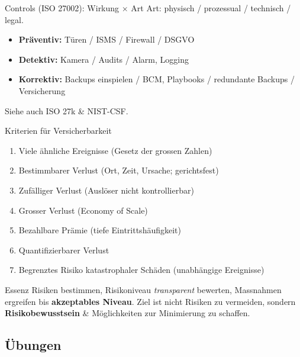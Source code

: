 \documentclass[a4paper, fontsize=7pt]{scrartcl}
\begin{document}
\begin{mainbox}{Controls (ISO 27002): Wirkung $\times$ Art}
Art: physisch / prozessual / technisch / legal.
\begin{itemize}
    \item \textbf{Präventiv:} Türen / ISMS / Firewall / DSGVO
    \item \textbf{Detektiv:} Kamera / Audits / Alarm, Logging
    \item \textbf{Korrektiv:} Backups einspielen / BCM, Playbooks /
          redundante Backups / Versicherung
\end{itemize}
Siehe auch ISO 27k \& NIST-CSF.
\end{mainbox}

\begin{subbox}{Kriterien für Versicherbarkeit}
\begin{enumerate}
    \item Viele ähnliche Ereignisse (Gesetz der grossen Zahlen)
    \item Bestimmbarer Verlust (Ort, Zeit, Ursache; gerichtsfest)
    \item Zufälliger Verlust (Auslöser nicht kontrollierbar)
    \item Grosser Verlust (Economy of Scale)
    \item Bezahlbare Prämie (tiefe Eintrittshäufigkeit)
    \item Quantifizierbarer Verlust
    \item Begrenztes Risiko katastrophaler Schäden (unabhängige Ereignisse)
\end{enumerate}
\end{subbox}

\begin{mainbox}{Essenz}
Risiken bestimmen, Risikoniveau \emph{transparent} bewerten, Massnahmen
ergreifen bis \textbf{akzeptables Niveau}. Ziel ist nicht Risiken zu
vermeiden, sondern \textbf{Risikobewusstsein} \& Möglichkeiten zur
Minimierung zu schaffen.
\end{mainbox}

\subsection{Übungen}
\end{document}
